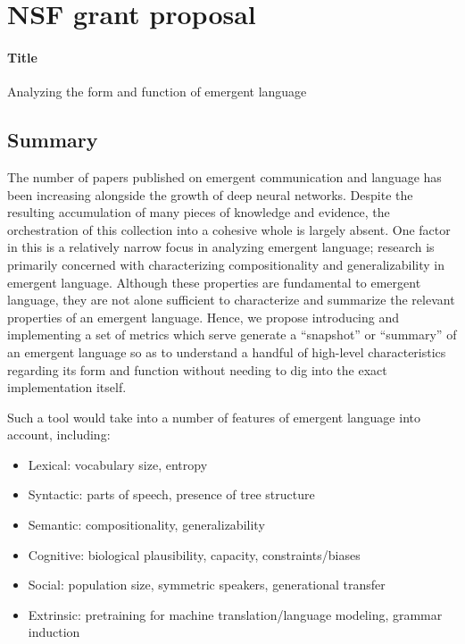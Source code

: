 \section{NSF grant proposal}

\paragraph{Title}
Analyzing the form and function of emergent language

\subsection{Summary}
The number of papers published on emergent communication and language has been increasing alongside the growth of deep neural networks.
Despite the resulting accumulation of many pieces of knowledge and evidence, the orchestration of this collection into a cohesive whole is largely absent.
One factor in this is a relatively narrow focus in analyzing emergent language; research is primarily concerned with characterizing compositionality and generalizability in emergent language.
Although these properties are fundamental to emergent language, they are not alone sufficient to characterize and summarize the relevant properties of an emergent language.
Hence, we propose introducing and implementing a set of metrics which serve generate a ``snapshot'' or ``summary'' of an emergent language so as to understand a handful of high-level characteristics regarding its form and function without needing to dig into the exact implementation itself.

Such a tool would take into a number of features of emergent language into account, including:
\begin{itemize}
    \item Lexical: vocabulary size, entropy
    \item Syntactic: parts of speech, presence of tree structure
    \item Semantic: compositionality, generalizability
    \item Cognitive: biological plausibility, capacity, constraints/biases
    \item Social: population size, symmetric speakers, generational transfer
    \item Extrinsic: pretraining for machine translation/language modeling, grammar induction
\end{itemize}

